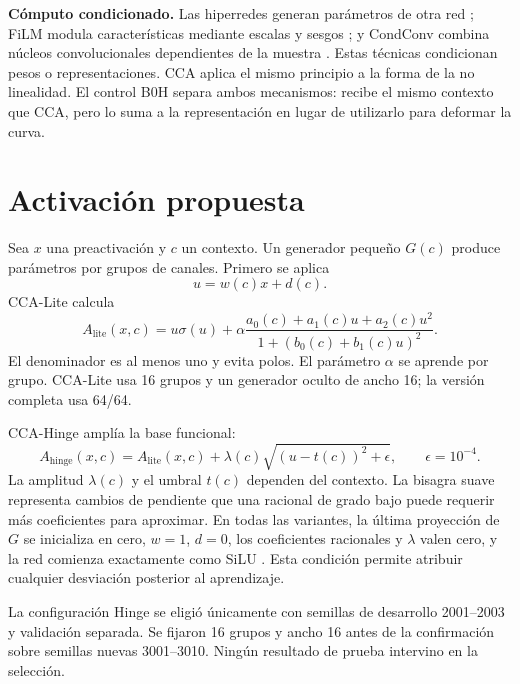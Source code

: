 \documentclass[runningheads]{llncs}
\begin{document}
\textbf{Cómputo condicionado.} Las hiperredes generan parámetros de otra red \cite{ha2017hypernetworks}; FiLM modula características mediante escalas y sesgos \cite{perez2018film}; y CondConv combina núcleos convolucionales dependientes de la muestra \cite{yang2019condconv}. Estas técnicas condicionan pesos o representaciones. CCA aplica el mismo principio a la forma de la no linealidad. El control B0H separa ambos mecanismos: recibe el mismo contexto que CCA, pero lo suma a la representación en lugar de utilizarlo para deformar la curva.

\section{Activación propuesta}
Sea $x$ una preactivación y $c$ un contexto. Un generador pequeño $G(c)$ produce parámetros por grupos de canales. Primero se aplica
\begin{equation}
u=w(c)x+d(c).
\label{eq:affine}
\end{equation}
CCA-Lite calcula
\begin{equation}
A_{\mathrm{lite}}(x,c)=u\sigma(u)+
\alpha\frac{a_0(c)+a_1(c)u+a_2(c)u^2}{1+\left(b_0(c)+b_1(c)u\right)^2}.
\label{eq:cca}
\end{equation}
El denominador es al menos uno y evita polos. El parámetro $\alpha$ se aprende por grupo. CCA-Lite usa 16 grupos y un generador oculto de ancho 16; la versión completa usa 64/64.

CCA-Hinge amplía la base funcional:
\begin{equation}
A_{\mathrm{hinge}}(x,c)=A_{\mathrm{lite}}(x,c)+
\lambda(c)\sqrt{(u-t(c))^2+\epsilon},\qquad \epsilon=10^{-4}.
\label{eq:hinge}
\end{equation}
La amplitud $\lambda(c)$ y el umbral $t(c)$ dependen del contexto. La bisagra suave representa cambios de pendiente que una racional de grado bajo puede requerir más coeficientes para aproximar. En todas las variantes, la última proyección de $G$ se inicializa en cero, $w=1$, $d=0$, los coeficientes racionales y $\lambda$ valen cero, y la red comienza exactamente como SiLU \cite{silu}. Esta condición permite atribuir cualquier desviación posterior al aprendizaje.

La configuración Hinge se eligió únicamente con semillas de desarrollo 2001--2003 y validación separada. Se fijaron 16 grupos y ancho 16 antes de la confirmación sobre semillas nuevas 3001--3010. Ningún resultado de prueba intervino en la selección.
\end{document}
